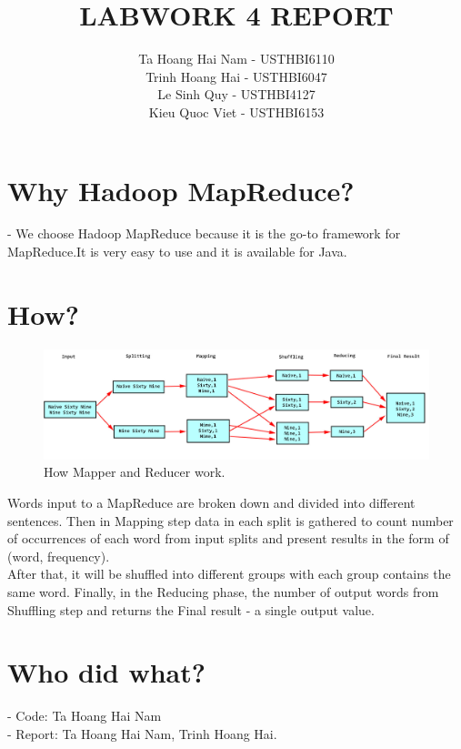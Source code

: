 \documentclass[12pt,a4paper]{article}
\title{LABWORK 4 REPORT}
\author{Ta Hoang Hai Nam - USTHBI6110 \\ Trinh Hoang Hai - USTHBI6047 \\ Le Sinh Quy - USTHBI4127 \\ Kieu Quoc Viet - USTHBI6153 }
\begin{document}
\maketitle
\newpage 
\section{Why Hadoop MapReduce?}
- We choose Hadoop MapReduce because it is the go-to framework for MapReduce.It is very easy to use and it is available for Java.
\section{How?}
\begin{figure}[!h]
\includegraphics[width=\linewidth]{Mapper_Reducer.jpg}
\caption{How Mapper and Reducer work.}
\end{figure}
Words input to a MapReduce  are broken down and divided into different sentences. 
Then in Mapping step data in each split is gathered to count number of occurrences of each word from input splits and present results in the form of (word, frequency). 
\\ After that,  it will be shuffled into different groups with each group contains the same word. Finally, in the Reducing phase,  the number of output words from Shuffling step and returns the Final result - a single output value. 
\section{Who did what?}
- Code: Ta Hoang Hai Nam \\
- Report: Ta Hoang Hai Nam, Trinh Hoang Hai.
\end{document}
